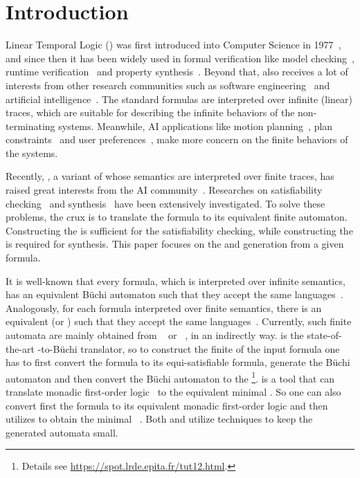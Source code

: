 \section{Introduction}

Linear Temporal Logic (\ltl) was first introduced into Computer Science in 1977~\cite{Pnu77}, and since then it has been widely used in formal verification like model checking~\cite{CGD99}, runtime verification~\cite{BLS11} and property synthesis~\cite{JGWB07,BFJ12}. Beyond that, \ltl also receives a lot of interests from other research communities such as software engineering~\cite{BKMR15} and artificial intelligence~\cite{BK98}. The standard \ltl formulas are interpreted over infinite (linear) traces, which are suitable for describing the infinite behaviors of the non-terminating systems. Meanwhile, AI applications like motion planning~\cite{BK98,DV99,CDV02,PLGG11,CBMM17}, plan constraints~\cite{BK00,Gab04} and user preferences~\cite{BFM06,BFM11,SBM11}, make more concern on the finite behaviors of the systems. 

Recently, \ltlf, a variant of \ltl whose semantics are interpreted over finite traces, has raised great interests from the AI community~\cite{GV13,GV15}. Researches on \ltlf satisfiability checking~\cite{LZPVH14,LRPZV19} and \ltlf synthesis~\cite{GV15} have been extensively investigated. To solve these problems, the crux is to translate the \ltlf formula to its equivalent finite automaton. Constructing the \NFA is sufficient for the satisfiability checking, while constructing the \DFA is required for \ltlf synthesis. This paper focuses on the \NFA and \DFA generation from a given \ltlf formula. 

It is well-known that every \ltl formula, which is interpreted over infinite semantics, has an equivalent B\"uchi automaton such that they accept the same languages~\cite{GPVW95}. Analogously, for each \ltlf formula interpreted over finite semantics, there is an equivalent \NFA (or \DFA) such that they accept the same languages~\cite{GV15}. Currently, such finite automata are mainly obtained from \spot~\cite{DP04} or \mona~\cite{HJJKPRS95,EKM98}, in an indirectly way. \spot is the state-of-the-art \ltl-to-B\"uchi translator, so to construct the finite \NFA of the input \ltlf formula one has to first convert the \ltlf formula to its equi-satisfiable \ltl formula, generate the B\"uchi automaton and then convert the B\"uchi automaton to the \NFA\footnote{Details see \url{https://spot.lrde.epita.fr/tut12.html}.}. \mona is a tool that can translate monadic first-order logic~\cite{Tra62} to the equivalent minimal \DFA. So one can also convert first the \ltlf formula to its equivalent monadic first-order logic and then utilizes \mona to obtain the minimal \DFA~\cite{}. Both \spot and \mona utilize \BDD techniques to keep the generated automata small. 

